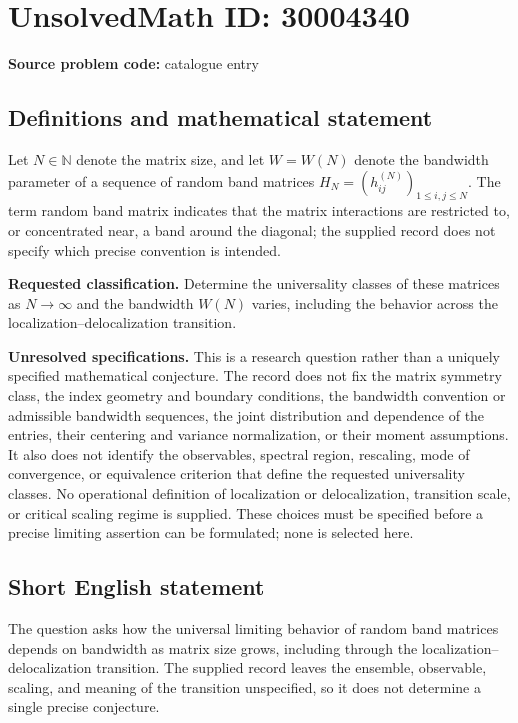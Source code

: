 \documentclass[11pt]{article}
\newcommand{\N}{\mathbb{N}}
\begin{document}
\section*{UnsolvedMath ID: 30004340}
\textbf{Source problem code:} catalogue entry
\subsection{Definitions and mathematical statement}
Let \(N\in\N\) denote the matrix size, and let \(W=W(N)\) denote the bandwidth parameter of a sequence of random band matrices \(H_N=(h_{ij}^{(N)})_{1\leq i,j\leq N}\). The term random band matrix indicates that the matrix interactions are restricted to, or concentrated near, a band around the diagonal; the supplied record does not specify which precise convention is intended.

\textbf{Requested classification.} Determine the universality classes of these matrices as \(N\to\infty\) and the bandwidth \(W(N)\) varies, including the behavior across the localization--delocalization transition.

\textbf{Unresolved specifications.} This is a research question rather than a uniquely specified mathematical conjecture. The record does not fix the matrix symmetry class, the index geometry and boundary conditions, the bandwidth convention or admissible bandwidth sequences, the joint distribution and dependence of the entries, their centering and variance normalization, or their moment assumptions. It also does not identify the observables, spectral region, rescaling, mode of convergence, or equivalence criterion that define the requested universality classes. No operational definition of localization or delocalization, transition scale, or critical scaling regime is supplied. These choices must be specified before a precise limiting assertion can be formulated; none is selected here.
\subsection{Short English statement}
The question asks how the universal limiting behavior of random band matrices depends on bandwidth as matrix size grows, including through the localization--delocalization transition. The supplied record leaves the ensemble, observable, scaling, and meaning of the transition unspecified, so it does not determine a single precise conjecture.
\end{document}
